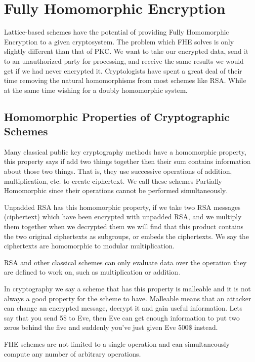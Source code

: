 \section{Fully Homomorphic Encryption} 
Lattice-based schemes have the potential of providing Fully Homomorphic Encryption to a given cryptosystem. 
The problem which FHE solves is only slightly different than that of PKC. We want to take our encrypted data, send it to an unauthorized party for processing, 
and receive the same results we would get if we had never encrypted it.
\newline
Cryptologists have spent a great deal of their time removing the natural homomorphisms from most schemes like RSA. While at the same time wishing for a doubly homomorphic system. 


\newline

\subsection{Homomorphic Properties of Cryptographic Schemes} 
Many classical public key cryptography methods have a homomorphic property, this property says if add two things together then their sum contains information about those two things.
That is, they use successive operations of addition, multiplication, etc. to create ciphertext. 
We call these schemes Partially Homomorphic since their operations cannot be performed simultaneously. 

Unpadded RSA has this homomorphic property, if we take two RSA messages (ciphertext) which have been encrypted with unpadded RSA, and we multiply them together when we decrypted them we will find that this product contains the two original ciphertexts as subgroups, or embeds the ciphertexts. We say the ciphertexts are homomorphic to modular multiplication. 

RSA and other classical schemes can only evaluate data over the operation they are defined to work on, such as multiplication or addition. 

In cryptography we say a scheme that has this property is malleable and it is not always a good property for the scheme to have. Malleable means that an attacker can change an encrypted message, decrypt it and gain useful information. Lets say that you send 5\$ to Eve, then Eve can get enough information to put two zeros behind the five and suddenly you’ve just given Eve 500\$ instead. 

\newline
FHE schemes are not limited to a single operation and can simultaneously compute any number of arbitrary operations. 

